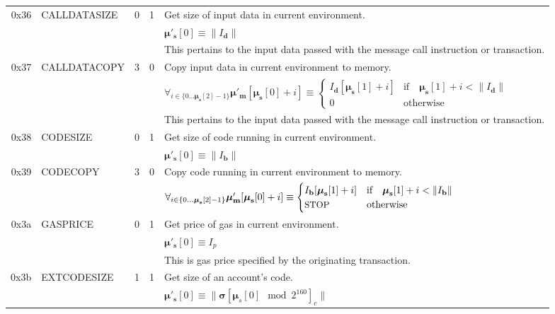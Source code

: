 \documentclass[9pt,oneside]{amsart}
\begin{document}
\begin{tabular*}{\columnwidth}[h]{rlrrl}
\midrule
0x36 & {\small CALLDATASIZE} & 0 & 1 & Get size of input data in current environment. \\
&&&& $\boldsymbol{\mu}'_\mathbf{s}[0] \equiv \lVert I_\mathbf{d} \rVert$ \\
&&&& This pertains to the input data passed with the message call instruction or transaction. \\
\midrule
0x37 & {\small CALLDATACOPY} & 3 & 0 & Copy input data in current environment to memory. \\
&&&& $\forall_{i \in \{ 0 \dots \boldsymbol{\mu}_\mathbf{s}[2] - 1\} } \boldsymbol{\mu}'_\mathbf{m}[\boldsymbol{\mu}_\mathbf{s}[0] + i ] \equiv
\begin{cases} I_\mathbf{d}[\boldsymbol{\mu}_\mathbf{s}[1] + i] & \text{if} \quad \boldsymbol{\mu}_\mathbf{s}[1] + i < \lVert I_\mathbf{d} \rVert \\ 0 & \text{otherwise} \end{cases}$\\
&&&& This pertains to the input data passed with the message call instruction or transaction. \\
\midrule
0x38 & {\small CODESIZE} & 0 & 1 & Get size of code running in current environment. \\
&&&& $\boldsymbol{\mu}'_\mathbf{s}[0] \equiv \lVert I_\mathbf{b} \rVert$ \\
\midrule
0x39 & {\small CODECOPY} & 3 & 0 & Copy code running in current environment to memory. \\
&&&& $\forall_{i \in \{ 0 \dots \boldsymbol{\mu}_\mathbf{s}[2] - 1\} } \boldsymbol{\mu}'_\mathbf{m}[\boldsymbol{\mu}_\mathbf{s}[0] + i ] \equiv
\begin{cases} I_\mathbf{b}[\boldsymbol{\mu}_\mathbf{s}[1] + i] & \text{if} \quad \boldsymbol{\mu}_\mathbf{s}[1] + i < \lVert I_\mathbf{b} \rVert \\ \text{\small STOP} & \text{otherwise} \end{cases}$\\
\midrule
0x3a & {\small GASPRICE} & 0 & 1 & Get price of gas in current environment. \\
&&&& $\boldsymbol{\mu}'_\mathbf{s}[0] \equiv I_p$ \\
&&&& This is gas price specified by the originating transaction.\\
\midrule
0x3b & {\small EXTCODESIZE} & 1 & 1 & Get size of an account's code. \\
&&&& $\boldsymbol{\mu}'_\mathbf{s}[0] \equiv \lVert \boldsymbol{\sigma}[\boldsymbol{\mu}_s[0] \mod 2^{160}]_c \rVert$ \\

\end{tabular*}
\end{document}
